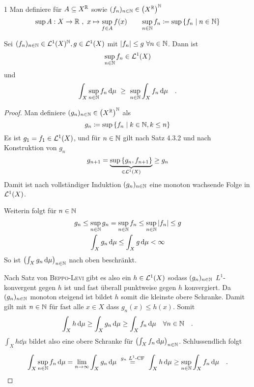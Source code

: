 \documentclass{anablatt}
\begin{document}
\makeheader
\setcounter{taski}1
Man definiere für $A \subseteq X^{\mathbb{R}}$ sowie $(f_n)_{n\in\mathbb{N}} \in \qty(X^{\mathbb{R}})^{\mathbb{N}}$
\[ \sup A : X \rightarrow \mathbb{R} ~,~ x \mapsto \sup_{f \in A} f(x) \qquad \sup_{n\in\mathbb{N}} f_n \coloneqq \sup \qty{f_n \mid n\in\ensuremath{\mathbb{N}} } \]

\begin{theorem}
Sei $(f_n)_{n \in \mathbb{N}} \in \mathcal{L}^1(X)^{\mathbb{N}}, g \in \mathcal{L}^1(X)$ mit $|f_n| \leq g~\forall n \in \mathbb{N}$. Dann ist
\[ \sup_{n\in\mathbb{N}}f_n \in \mathcal{L}^1(X) \]
und
\[ \int_X \sup_{n\in\N}f_n\dd\mu ~\geq~ \sup_{n\in\N}\int_Xf_n\dd\mu \quad. \]
\end{theorem}
\begin{proof}
Man definiere $(g_n)_{n\in\mathbb{N}} \in \qty(X^{\mathbb{R}})^{\mathbb{N}}$ als
\[ g_n \coloneqq \sup\qty{f_n \mid k\in\ensuremath{\mathbb{N}} ,k\leq n}  \]
Es ist $g_1 = f_1 \in \mathcal{L}^1(X)$, und für $n \in \mathbb{N}$ gilt nach Satz 4.3.2 und nach Konstruktion von $g_n$
\[ g_{n+1} = \underbrace{\sup\qty{g_n, f_{n+1}}}_{\in \mathcal{L}^1(X)} \geq g_n \]
Damit ist nach vollständiger Induktion $(g_n)_{n\in\mathbb{N}}$ eine monoton wachsende Folge in $\mathcal{L}^1(X)$.

Weiterin folgt für $n\in\mathbb{N}$
\begin{gather*}
    g_n \leq \sup_{n\in\N} g_n = \sup_{n\in\N} f_n \leq \sup_{n\in\N} |f_n| \leq g \\
    \int_X g_n\dd\mu \leq \int_Xg\dd\mu < \infty
\end{gather*}
So ist $\qty(\int_X g_n\dd\mu)_{n\in\N}$ nach oben beschränkt.

Nach Satz von \textsc{Beppo-Levi} gibt es also ein $h \in \mathcal{L}^1(X)$ sodass $(g_n)_{n\in\mathbb{N}}$ $L^1$-konvergent gegen $h$ ist und fast überall punktweise gegen $h$ konvergiert. Da $(g_n)_{n\in\mathbb{N}}$ monoton steigend ist bildet $h$ somit die kleinste obere Schranke. Damit gilt mit $n \in \mathbb{N}$ für fast alle $x \in X$ dass $g_n(x) \leq h(x)$. Somit
\[ \int_Xh\dd\mu \geq \int_Xg_n\dd\mu \geq \int_Xf_n\dd\mu \quad\forall n \in \N \quad.\]
$\int_Xh\dd\mu$ bildet also eine obere Schranke für  $\qty(\int_Xf_n\dd\mu)_{n \in \N}$. Schlussendlich folgt

\[ \int_X\sup_{n\in\N}f_n\dd\mu = \lim_{n \rightarrow\infty} \int_Xg_n\dd\mu ~\stackrel{\text{$g_n$ $L^1$-CF}}=~ \int_Xh\dd\mu
    \geq\sup_{n\in\N}\int_Xf_n\dd\mu \quad.
\]
\end{proof}
\end{document}
